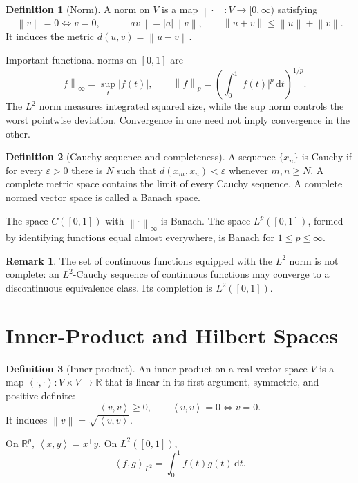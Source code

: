 \documentclass[12pt,oneside]{book}
\numberwithin{equation}{section}
\theoremstyle{definition}
\newtheorem{definition}{Definition}[section]
\newtheorem{remark}{Remark}[section]
\theoremstyle{plain}
\theoremstyle{remark}
\newcommand{\R}{\mathbb{R}}
\newcommand{\norm}[1]{\left\lVert #1 \right\rVert}
\newcommand{\abs}[1]{\left\lvert #1 \right\rvert}
\newcommand{\inner}[2]{\left\langle #1, #2 \right\rangle}
\newcommand{\dd}{\,\mathrm{d}}
\begin{document}
\begin{definition}[Norm]
A norm on $V$ is a map $\norm{\cdot}:V\to[0,\infty)$ satisfying
\[
 \norm v=0\Longleftrightarrow v=0,\qquad
 \norm{av}=\abs a\norm v,\qquad
 \norm{u+v}\leq\norm u+\norm v.
\]
It induces the metric $d(u,v)=\norm{u-v}$.
\end{definition}

Important functional norms on $[0,1]$ are
\[
 \norm f_\infty=\sup_t\abs{f(t)},\qquad
 \norm f_p=\left(\int_0^1\abs{f(t)}^p\dd t\right)^{1/p}.
\]
The $L^2$ norm measures integrated squared size, while the sup norm controls
the worst pointwise deviation. Convergence in one need not imply convergence
in the other.

\begin{definition}[Cauchy sequence and completeness]
A sequence $\{x_n\}$ is Cauchy if for every $\varepsilon>0$ there is $N$ such
that $d(x_m,x_n)<\varepsilon$ whenever $m,n\geq N$. A complete metric space
contains the limit of every Cauchy sequence. A complete normed vector space is
called a Banach space.
\end{definition}

The space $C([0,1])$ with $\norm{\cdot}_\infty$ is Banach. The space
$L^p([0,1])$, formed by identifying functions equal almost everywhere, is
Banach for $1\leq p\leq\infty$.

\begin{remark}
The set of continuous functions equipped with the $L^2$ norm is not complete:
an $L^2$-Cauchy sequence of continuous functions may converge to a
discontinuous equivalence class. Its completion is $L^2([0,1])$.
\end{remark}

\section{Inner-Product and Hilbert Spaces}

\begin{definition}[Inner product]
An inner product on a real vector space $V$ is a map
$\inner{\cdot}{\cdot}:V\times V\to\R$ that is linear in its first argument,
symmetric, and positive definite:
\[
    \inner v v\geq0,\qquad \inner v v=0\Longleftrightarrow v=0.
\]
It induces $\norm v=\sqrt{\inner v v}$.
\end{definition}

On $\R^p$, $\inner x y=x^\mathsf Ty$. On $L^2([0,1])$,
\begin{equation}
    \inner f g_{L^2}=\int_0^1f(t)g(t)\dd t.
    \label{eq:l2-inner-product}
\end{equation}
\end{document}
